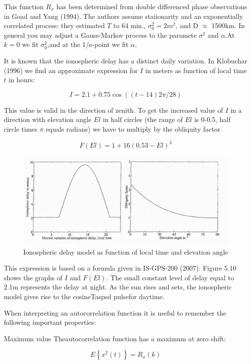  
 This function $ R_{x} $ has been determined from double differenced phase observations in Goad and Yang (1994). The authors assume staiionarity and an exponentially correlated process: they estimated $ T $ to 64 min., $ \sigma_{0}^{2}=2m^{2} $, and D $ \approx $ 1500km. In general you may adjust a Gauss-Markov process to the paramete $ \sigma^{2} $ and $ \alpha $.At $ k = 0 $ we fit $ \sigma_{0}^{2} $,and at the 1/e-point we fit $ \alpha $. 
 
 It is known that the ionospheric delay has a distinct daily variation. In Klobuchar (1996) we find an approximate expression for $ I $ in meters as function of local time $  t $ in hours: 
 
 \[ I=2.1+0.75\cos((t-14)2\pi/28) \]
 
 This value is valid in the direction of zenith. To get the increased value of $ I $ in a direction with elevation angle $ El $ in half circles (the range of $ El $ is 0-0.5, half circle times $ \pi $ equals radians) we have to multiply by the obliquity factor
 
 \[ F(El)=1+16(0.53-El)^{3} \]
 
 \begin{figure}[h]
 	\centering
 	\includegraphics[width=0.7\linewidth]{TeX_files/Part02/chapter05/image/9}
 	\caption{Ionospheric delay model as function of local time and elevation angle}
 	\label{ }
 \end{figure}
 
 
 This expression is based on a formula given in IS-GPS-200 (2007). Figure 5.10 shows the graphs of $ I $ and $ F(El) $. The small constant level of delay equal to 2.1m represents the delay at night. As the sun rises and sets, the ionospheric model gives rise to the cosineTaspsd pulsefor daytime. 
 
When interpreting an autocorrelation function it is useful to remember the following important properties:

 Maximum value Theautocorrelation function has a maximum at zero shift:  
 
 \[ E\left\lbrace x^{2}(t)\right\rbrace  = R_{x}(k) \]
 
